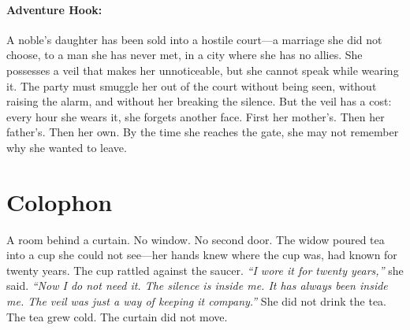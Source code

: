 \paragraph{Adventure Hook:}
A noble's daughter has been sold into a hostile court—a marriage she did not choose, to a man she has never met, in a city where she has no allies. She possesses a veil that makes her unnoticeable, but she cannot speak while wearing it. The party must smuggle her out of the court without being seen, without raising the alarm, and without her breaking the silence. But the veil has a cost: every hour she wears it, she forgets another face. First her mother's. Then her father's. Then her own. By the time she reaches the gate, she may not remember why she wanted to leave.

\section*{Colophon}
A room behind a curtain. No window. No second door. The widow poured tea into a cup she could not see—her hands knew where the cup was, had known for twenty years. The cup rattled against the saucer. \textit{``I wore it for twenty years,''} she said. \textit{``Now I do not need it. The silence is inside me. It has always been inside me. The veil was just a way of keeping it company.''} She did not drink the tea. The tea grew cold. The curtain did not move.